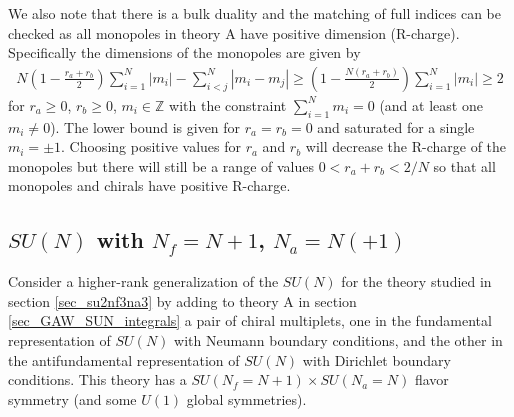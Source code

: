 \documentclass[12pt]{article}
\newcommand{\Zb}{\mathbb{Z}}
\numberwithin{equation}{section}
\begin{document}
We also note that there is a bulk duality and the matching of full indices can be checked as all monopoles in theory A have positive dimension (R-charge). Specifically the dimensions of the monopoles are given by
\begin{align}
\label{Mono_Ch_suN_N}
    N \left( 1 - \frac{r_a + r_b}{2} \right) \sum_{i=1}^N |m_i| - \sum_{i < j}^N |m_i - m_j| \ge \left( 1 - \frac{N(r_a + r_b)}{2} \right) \sum_{i=1}^N |m_i| \ge 2
\end{align}
for $r_a \ge 0$, $r_b \ge 0$, $m_i \in \Zb$ with the constraint $\sum_{i=1}^N m_i = 0$ (and at least one $m_i \ne 0$). The lower bound is given for $r_a = r_b = 0$ and saturated for a single $m_i = \pm 1$. Choosing positive values for $r_a$ and $r_b$ will decrease the R-charge of the monopoles but there will still be a range of values $0 < r_a + r_b < 2/N$ so that all monopoles and chirals have positive R-charge.

\subsection{$SU(N)$ with $N_f = N + 1$, $N_a = N (+ 1)$}
\label{sec_GNR_integrals}
Consider a higher-rank generalization of the $SU(N)$ for the theory studied in section \ref{sec_su2nf3na3} 
by adding to theory A in section \ref{sec_GAW_SUN_integrals} a pair of chiral multiplets, one 
in the fundamental representation of $SU(N)$ with Neumann boundary conditions,
and the other in the antifundamental representation of $SU(N)$ with
Dirichlet boundary conditions. This theory has a $SU(N_f = N+1) \times SU(N_a = N)$
flavor symmetry (and some $U(1)$ global symmetries). 
\end{document}
